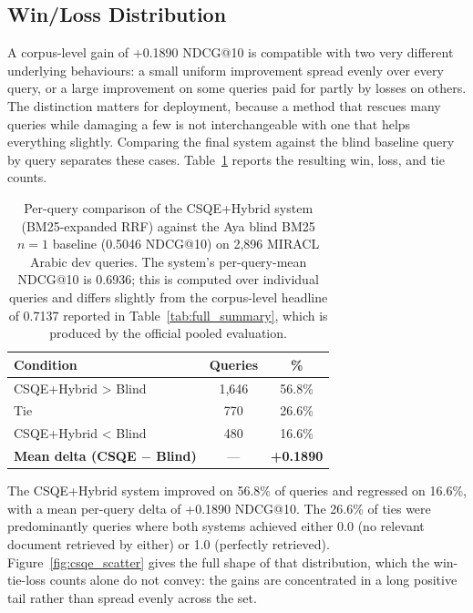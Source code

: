 \subsection{Win/Loss Distribution}
\label{sec:res_win_loss}

A corpus-level gain of +0.1890 NDCG@10 is compatible with two very different underlying behaviours: a small uniform improvement spread evenly over every query, or a large improvement on some queries paid for partly by losses on others. The distinction matters for deployment, because a method that rescues many queries while damaging a few is not interchangeable with one that helps everything slightly. Comparing the final system against the blind baseline query by query separates these cases. Table~\ref{tab:error_distribution} reports the resulting win, loss, and tie counts.

\begin{table}[htbp]
    \centering
    \caption[Per-query comparison of CSQE+Hybrid against the blind baseline]{Per-query comparison of the CSQE+Hybrid system (BM25-expanded RRF) against the Aya blind BM25 $n=1$ baseline (0.5046 NDCG@10) on 2,896 MIRACL Arabic dev queries. The system's per-query-mean NDCG@10 is 0.6936; this is computed over individual queries and differs slightly from the corpus-level headline of 0.7137 reported in Table~\ref{tab:full_summary}, which is produced by the official pooled evaluation.}
    \label{tab:error_distribution}
    \begin{tabular}{@{}lcc@{}}
        \toprule
        \textbf{Condition} & \textbf{Queries} & \textbf{\%} \\
        \midrule
        CSQE+Hybrid > Blind & 1,646 & 56.8\% \\
        Tie & 770 & 26.6\% \\
        CSQE+Hybrid < Blind & 480 & 16.6\% \\
        \midrule
        \textbf{Mean delta (CSQE $-$ Blind)} & --- & \textbf{+0.1890} \\
        \bottomrule
    \end{tabular}
\end{table}

The CSQE+Hybrid system improved on 56.8\% of queries and regressed on 16.6\%, with a mean per-query delta of +0.1890 NDCG@10. The 26.6\% of ties were predominantly queries where both systems achieved either 0.0 (no relevant document retrieved by either) or 1.0 (perfectly retrieved). Figure~\ref{fig:csqe_scatter} gives the full shape of that distribution, which the win-tie-loss counts alone do not convey: the gains are concentrated in a long positive tail rather than spread evenly across the set.


